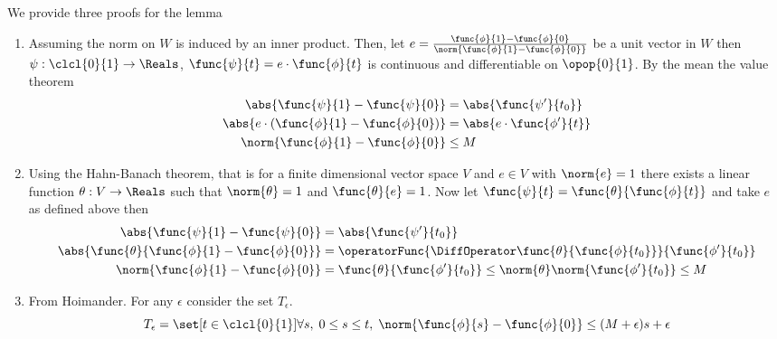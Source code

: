 \begin{prooflemma}
    We provide three proofs for the lemma
    \begin{enumerate}
        \item Assuming the norm on \(W\) is induced by an inner product. Then, let \( e = \frac{\func{\phi}{1} - \func{\phi}{0}}{\norm{\func{\phi}{1} - \func{\phi}{0}}}\) be a unit vector in \(W\) then \(\psi : \clcl{0}{1} \to \Reals\), \(\func{\psi}{t} = e \cdot \func{\phi}{t}\) is continuous and differentiable on \(\opop{0}{1}\). By the mean the value theorem
              \begin{align*}
                  \abs{\func{\psi}{1} - \func{\psi}{0}}                        & = \abs{\func{\psi'}{t_0}}       \\
                  \abs{e \cdot \left( \func{\phi}{1} - \func{\phi}{0} \right)} & = \abs{e \cdot \func{\phi'}{t}} \\
                  \norm{\func{\phi}{1} - \func{\phi}{0}}                       & \leq M
              \end{align*}
        \item Using the Hahn-Banach theorem, that is for a finite dimensional vector space \(V\) and \(e \in V\) with \(\norm{e} = 1\) there exists a linear function \(\theta : V \to \Reals\) such that \(\norm{\theta} = 1\) and \(\func{\theta}{e} = 1\). Now let \(\func{\psi}{t} = \func{\theta}{\func{\phi}{t}}\) and take \(e\) as defined above then
              \begin{align*}
                  \abs{\func{\psi}{1} - \func{\psi}{0}}                & = \abs{\func{\psi'}{t_0}}                                                             \\
                  \abs{\func{\theta}{\func{\phi}{1} - \func{\phi}{0}}} & = \operatorFunc{\DiffOperator \func{\theta}{\func{\phi}{t_0}}}{\func{\phi'}{t_0}}     \\
                  \norm{\func{\phi}{1} - \func{\phi}{0}}               & = \func{\theta}{\func{\phi'}{t_0}} \leq \norm{\theta} \norm{\func{\phi'}{t_0}} \leq M
              \end{align*}
        \item From Hoimander. For any \(\epsilon\) consider the set \(T_\epsilon\).
              \begin{equation*}
                  T_\epsilon = \set[t \in \clcl{0}{1}]{\forall s, \; 0 \leq s \leq t, \; \norm{\func{\phi}{s} - \func{\phi}{0}} \leq(M + \epsilon)s + \epsilon}
              \end{equation*}

\end{enumerate}
\end{prooflemma}

